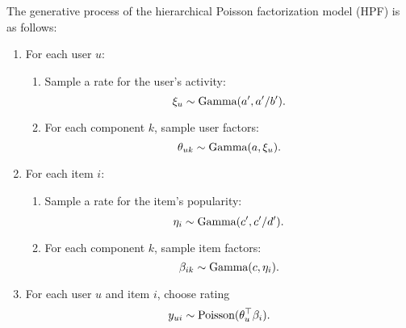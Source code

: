 The generative process of the hierarchical Poisson factorization model
(HPF) is as follows:
\begin{enumerate}
\item For each user $u$:
  \begin{enumerate}
    \item Sample a rate for the user's activity:
      \begin{equation*}
        \xi_u \sim \textrm{Gamma}(a', a'/b').
      \end{equation*}
    \item For each component $k$, sample user factors:
      \begin{equation*}
        \theta_{uk} \sim \textrm{Gamma}(a, \xi_u).
      \end{equation*}
  \end{enumerate}

\item For each item $i$:
  \begin{enumerate}
    \item Sample a rate for the item's popularity:
      \begin{equation*}
        \eta_i \sim \textrm{Gamma}(c', c'/d').
      \end{equation*}
    \item For each component $k$, sample item factors:
      \begin{equation*}
        \beta_{ik} \sim \textrm{Gamma}(c, \eta_i).
      \end{equation*}
  \end{enumerate}

\item For each user $u$ and item $i$, choose rating
  \begin{equation*}
    y_{ui} \sim \textrm{Poisson}(\theta_u^\top \beta_i).
  \end{equation*}
\end{enumerate}




